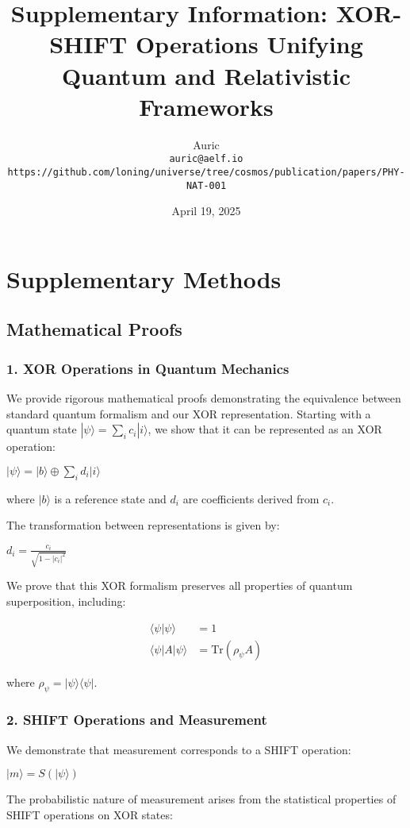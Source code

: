 \documentclass[10pt]{article}
\title{Supplementary Information: XOR-SHIFT Operations Unifying Quantum and Relativistic Frameworks}
\author{Auric \\ \texttt{auric@aelf.io} \\ \texttt{https://github.com/loning/universe/tree/cosmos/publication/papers/PHY-NAT-001}}
\date{April 19, 2025}
\begin{document}
\maketitle

\section*{Supplementary Methods}

\subsection*{Mathematical Proofs}

\subsubsection*{1. XOR Operations in Quantum Mechanics}

We provide rigorous mathematical proofs demonstrating the equivalence between standard quantum formalism and our XOR representation. Starting with a quantum state $|\psi\rangle = \sum_i c_i |i\rangle$, we show that it can be represented as an XOR operation:

$|\psi\rangle = |b\rangle \oplus \sum_i d_i |i\rangle$

where $|b\rangle$ is a reference state and $d_i$ are coefficients derived from $c_i$.

The transformation between representations is given by:

$d_i = \frac{c_i}{\sqrt{1-|c_i|^2}}$

We prove that this XOR formalism preserves all properties of quantum superposition, including:

\begin{align}
\langle\psi|\psi\rangle &= 1\\
\langle\psi|A|\psi\rangle &= \text{Tr}(\rho_\psi A)
\end{align}

where $\rho_\psi = |\psi\rangle\langle\psi|$.

\subsubsection*{2. SHIFT Operations and Measurement}

We demonstrate that measurement corresponds to a SHIFT operation:

$|m\rangle = S(|\psi\rangle)$

The probabilistic nature of measurement arises from the statistical properties of SHIFT operations on XOR states:
\end{document}
